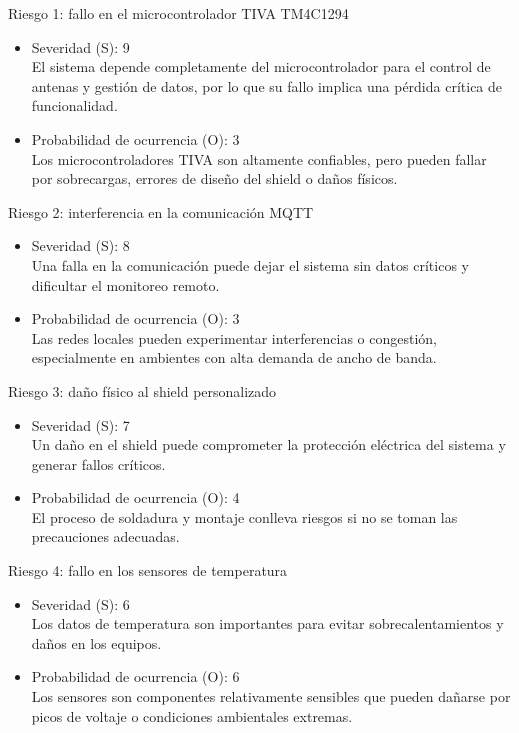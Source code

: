 \documentclass[
11pt, %
]{charter}
\begin{document}
 
Riesgo 1: fallo en el microcontrolador TIVA TM4C1294
\begin{itemize}
	\item Severidad (S): 9 \\ 
	El sistema depende completamente del microcontrolador para el control de antenas y gestión de datos, por lo que su fallo implica una pérdida crítica de funcionalidad.
	\item Probabilidad de ocurrencia (O): 3 \\
	Los microcontroladores TIVA son altamente confiables, pero pueden fallar por sobrecargas, errores de diseño del shield o daños físicos.
\end{itemize}   

Riesgo 2: interferencia en la comunicación MQTT
\begin{itemize}
	\item Severidad (S): 8 \\ 
	Una falla en la comunicación puede dejar el sistema sin datos críticos y dificultar el monitoreo remoto.
	\item Probabilidad de ocurrencia (O): 3 \\
	Las redes locales pueden experimentar interferencias o congestión, especialmente en ambientes con alta demanda de ancho de banda.
\end{itemize}   

Riesgo 3: daño físico al shield personalizado
\begin{itemize}
	\item Severidad (S): 7 \\ 
	Un daño en el shield puede comprometer la protección eléctrica del sistema y generar fallos críticos.
	\item Probabilidad de ocurrencia (O): 4 \\
	El proceso de soldadura y montaje conlleva riesgos si no se toman las precauciones adecuadas.
\end{itemize}   

Riesgo 4: fallo en los sensores de temperatura
\begin{itemize}
	\item Severidad (S): 6 \\ 
	Los datos de temperatura son importantes para evitar sobrecalentamientos y daños en los equipos.
	\item Probabilidad de ocurrencia (O): 6 \\
	Los sensores son componentes relativamente sensibles que pueden dañarse por picos de voltaje o condiciones ambientales extremas.
\end{itemize}   
\end{document}
